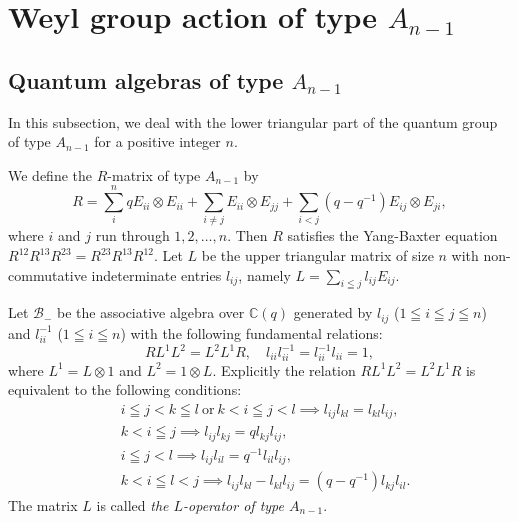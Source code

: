 \documentclass[12pt,twoside]{article}
\newcommand\B{{\mathcal B}}
\newcommand\ot{\otimes}
\newcommand\C{{\mathbb C}} %
\theoremstyle{plain} %
\theoremstyle{definition} %
\theoremstyle{definition} %
\numberwithin{theorem}{section}
\numberwithin{equation}{section}
\numberwithin{figure}{section}
\numberwithin{table}{section}
\begin{document}

\section{Weyl group action of type $A_{n-1}$}
\label{sec:A_{n-1}}


\subsection{Quantum algebras of type $A_{n-1}$}
\label{sec:quantum-alg-A_{n-1}}

In this subsection, we deal with the lower triangular part of 
the quantum group of type $A_{n-1}$ for a positive integer $n$.

We define the $R$-matrix of type $A_{n-1}$ by
\begin{equation}
 R 
 = \sum_i^n q E_{ii}\ot E_{ii}
 + \sum_{i\ne j} E_{ii}\ot E_{jj}
 + \sum_{i<j} (q-q^{-1}) E_{ij}\ot E_{ji},
 \label{eq:def-R}
\end{equation}
where $i$ and $j$ run through $1,2,\ldots,n$.
Then $R$ satisfies the Yang-Baxter equation
$R^{12}R^{13}R^{23} = R^{23}R^{13}R^{12}$.
Let $L$ be the upper triangular matrix of size $n$ with 
non-commutative indeterminate entries $l_{ij}$,
namely $L = \sum_{i\leqq j} l_{ij} E_{ij}$.

Let $\B_-$ be the associative algebra over $\C(q)$ 
generated by $l_{ij}$ ($1\leqq i\leqq j\leqq n$) 
and $l_{ii}^{-1}$ ($1\leqq i\leqq n$)
with the following fundamental relations:
\begin{equation}
 R L^1L^2 = L^2L^1R,
 \quad l_{ii} l_{ii}^{-1} = l_{ii}^{-1}l_{ii} = 1,
 \label{eq:RLL=LLR}
\end{equation}
where $L^1=L\ot 1$ and $L^2=1\ot L$. 
Explicitly the relation $R L^1L^2=L^2L^1R$ is equivalent to
the following conditions:
\begin{align*}
 &
 i\leqq j<k\leqq l \ \text{or}\ k<i\leqq j<l 
 \implies l_{ij}l_{kl} = l_{kl}l_{ij},
 \\ &
 k<i\leqq j \implies l_{ij}l_{kj}=q l_{kj}l_{ij},
 \\ &
 i\leqq j<l \implies l_{ij}l_{il}=q^{-1}l_{il}l_{ij},
 \\ &
 k<i\leqq l<j \implies 
 l_{ij}l_{kl} - l_{kl}l_{ij} = (q-q^{-1}) l_{kj}l_{il}.
\end{align*}
The matrix $L$ is called {\em the $L$-operator of type $A_{n-1}$}.
\end{document}
